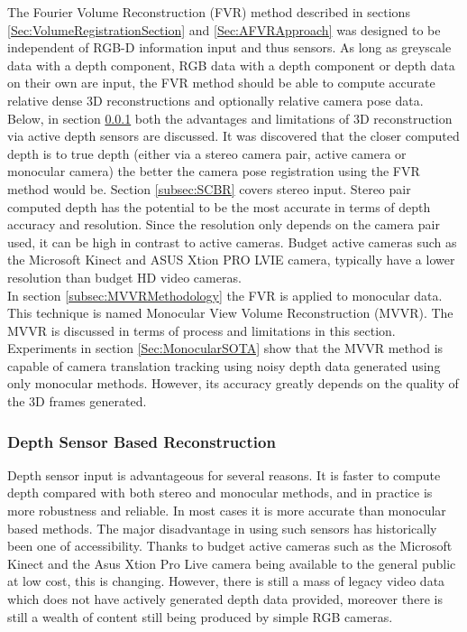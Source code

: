 
The Fourier Volume Reconstruction (FVR) method described in sections \ref{Sec:VolumeRegistrationSection} and \ref{Sec:AFVRApproach} was designed to be independent of RGB-D information input and thus sensors. As long as greyscale data with a depth component, RGB data with a depth component or depth data on their own are input, the FVR method should be able to compute accurate relative dense 3D reconstructions and optionally relative camera pose data. \\

Below, in section \ref{subsec:DSBR} both the advantages and limitations of 3D reconstruction via active depth sensors are discussed. It was discovered that the closer computed depth is to true depth (either via a stereo camera pair, active camera or monocular camera) the better the camera pose registration using the FVR method would be. Section \ref{subsec:SCBR} covers stereo input. Stereo pair computed depth has the potential to be the most accurate in terms of depth accuracy and resolution. Since the resolution only depends on the camera pair used, it can be high in contrast to active cameras. Budget active cameras such as the Microsoft Kinect and ASUS Xtion PRO LVIE camera, typically have a lower resolution than budget HD video cameras. \\

In section \ref{subsec:MVVRMethodology} the FVR is applied to monocular data. This technique is named Monocular View Volume Reconstruction (MVVR). The MVVR is discussed in terms of process and limitations in this section. Experiments in section \ref{Sec:MonocularSOTA} show that the MVVR method is capable of camera translation tracking using noisy depth data generated using only monocular methods. However, its accuracy greatly depends on the quality of the 3D frames generated. \\

\subsubsection{Depth Sensor Based Reconstruction}
\label{subsec:DSBR}

Depth sensor input is advantageous for several reasons. It is faster to compute depth compared with both stereo and monocular methods, and in practice is more robustness and reliable. In most cases it is more accurate than monocular based methods. The major disadvantage in using such sensors has historically been one of accessibility. Thanks to budget active cameras such as the Microsoft Kinect and the Asus Xtion Pro Live camera being available to the general public at low cost, this is changing. However, there is still a mass of legacy video data which does not have actively generated depth data provided, moreover there is still a wealth of content still being produced by simple RGB cameras. \\

